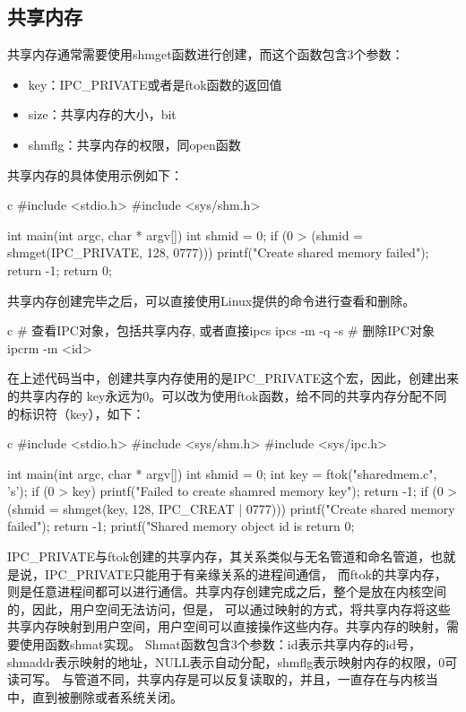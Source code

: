 \subsection{共享内存}
共享内存通常需要使用shmget函数进行创建，而这个函数包含3个参数：
\begin{itemize}
  \item key：IPC\_PRIVATE或者是ftok函数的返回值
  \item size：共享内存的大小，bit
  \item shmflg：共享内存的权限，同open函数
\end{itemize}
共享内存的具体使用示例如下：
\begin{code-block}{c}
#include <stdio.h>
#include <sys/shm.h>

int main(int argc, char * argv[])
{
        int shmid = 0;
        if (0 > (shmid = shmget(IPC_PRIVATE, 128, 0777)))
        {
                printf("Create shared memory failed\n");
                return -1;
        }
        return 0;
}
\end{code-block}

共享内存创建完毕之后，可以直接使用Linux提供的命令进行查看和删除。
\begin{code-block}{c}
# 查看IPC对象，包括共享内存, 或者直接ipcs
ipcs -m -q -s
# 删除IPC对象
ipcrm -m <id>
\end{code-block}
在上述代码当中，创建共享内存使用的是IPC\_PRIVATE这个宏，因此，创建出来的共享内存的
key永远为0。可以改为使用ftok函数，给不同的共享内存分配不同的标识符（key），如下：
\begin{code-block}{c}
#include <stdio.h>
#include <sys/shm.h>
#include <sys/ipc.h>

int main(int argc, char * argv[])
{
        int shmid = 0;
        int key = ftok("sharedmem.c", 's');
        if (0 > key)
        {
                printf("Failed to create shamred memory key\n");
                return -1;
        }
        if (0 > (shmid = shmget(key, 128, IPC_CREAT | 0777)))
        {
                printf("Create shared memory failed\n");
                return -1;
        }
        printf("Shared memory object id is %
        return 0;
}
\end{code-block}

IPC\_PRIVATE与ftok创建的共享内存，其关系类似与无名管道和命名管道，也就是说，IPC\_PRIVATE只能用于有亲缘关系的进程间通信，
而ftok的共享内存，则是任意进程间都可以进行通信。共享内存创建完成之后，整个是放在内核空间的，因此，用户空间无法访问，但是，
可以通过映射的方式，将共享内存将这些共享内存映射到用户空间，用户空间可以直接操作这些内存。共享内存的映射，需要使用函数shmat实现。
Shmat函数包含3个参数：id表示共享内存的id号，shmaddr表示映射的地址，NULL表示自动分配，shmflg表示映射内存的权限，0可读可写。
与管道不同，共享内存是可以反复读取的，并且，一直存在与内核当中，直到被删除或者系统关闭。


